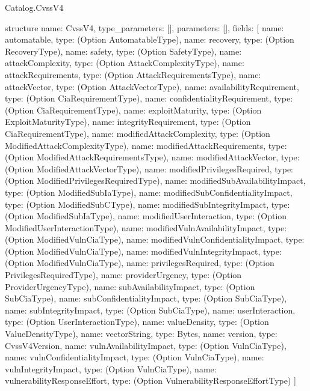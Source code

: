 \begin{lexlean}{Catalog.CvssV4}
\begin{semanticmodule}
structure{
  name: CvssV4,
  type_parameters: [],
  parameters: [],
  fields: [
    {name: automatable, type: (Option AutomatableType)},
    {name: recovery, type: (Option RecoveryType)},
    {name: safety, type: (Option SafetyType)},
    {name: attackComplexity, type: (Option AttackComplexityType)},
    {name: attackRequirements, type: (Option AttackRequirementsType)},
    {name: attackVector, type: (Option AttackVectorType)},
    {name: availabilityRequirement, type: (Option CiaRequirementType)},
    {name: confidentialityRequirement, type: (Option CiaRequirementType)},
    {name: exploitMaturity, type: (Option ExploitMaturityType)},
    {name: integrityRequirement, type: (Option CiaRequirementType)},
    {name: modifiedAttackComplexity, type: (Option ModifiedAttackComplexityType)},
    {name: modifiedAttackRequirements, type: (Option ModifiedAttackRequirementsType)},
    {name: modifiedAttackVector, type: (Option ModifiedAttackVectorType)},
    {name: modifiedPrivilegesRequired, type: (Option ModifiedPrivilegesRequiredType)},
    {name: modifiedSubAvailabilityImpact, type: (Option ModifiedSubIaType)},
    {name: modifiedSubConfidentialityImpact, type: (Option ModifiedSubCType)},
    {name: modifiedSubIntegrityImpact, type: (Option ModifiedSubIaType)},
    {name: modifiedUserInteraction, type: (Option ModifiedUserInteractionType)},
    {name: modifiedVulnAvailabilityImpact, type: (Option ModifiedVulnCiaType)},
    {name: modifiedVulnConfidentialityImpact, type: (Option ModifiedVulnCiaType)},
    {name: modifiedVulnIntegrityImpact, type: (Option ModifiedVulnCiaType)},
    {name: privilegesRequired, type: (Option PrivilegesRequiredType)},
    {name: providerUrgency, type: (Option ProviderUrgencyType)},
    {name: subAvailabilityImpact, type: (Option SubCiaType)},
    {name: subConfidentialityImpact, type: (Option SubCiaType)},
    {name: subIntegrityImpact, type: (Option SubCiaType)},
    {name: userInteraction, type: (Option UserInteractionType)},
    {name: valueDensity, type: (Option ValueDensityType)},
    {name: vectorString, type: Bytes},
    {name: version, type: CvssV4Version},
    {name: vulnAvailabilityImpact, type: (Option VulnCiaType)},
    {name: vulnConfidentialityImpact, type: (Option VulnCiaType)},
    {name: vulnIntegrityImpact, type: (Option VulnCiaType)},
    {name: vulnerabilityResponseEffort, type: (Option VulnerabilityResponseEffortType)}
  ]
}
\end{semanticmodule}
\end{lexlean}
